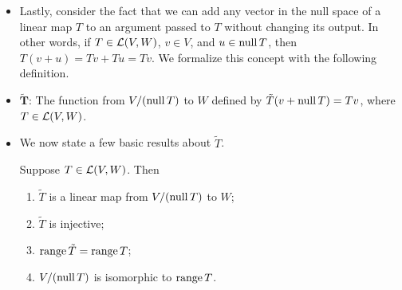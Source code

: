 \documentclass[../main.tex]{subfiles}
\begin{document}
\begin{itemize}
\begin{theorem}
        \begin{proof}
            Let $\pi$ be the quotient map from $V$ to $V/U$. From Theorem \ref{trm:affineEquivalenceProperties}, we know that in order for $w+U=0+U$, we must have $v-0=v\in U$. Thus, $\pi(u)=0$ if and only if $u\in U$, meaning $\nul\pi=U$. Additionally, we clearly have that $\range\pi=V/U$. Therefore, by the \hyperref[trm:fundamentalTheoremLinearMaps]{Fundamental Theorem of Linear Maps}, we have that
            \begin{align*}
                \dim V &= \dim\nul\pi+\dim\range\pi\\
                &= \dim U+\dim V/U\\
                \dim V/U &= \dim V-\dim U
            \end{align*}
            as desired.
        \end{proof}
    \end{theorem}
    \item Lastly, consider the fact that we can add any vector in the null space of a linear map $T$ to an argument passed to $T$ without changing its output. In other words, if $T\in\mathcal{L}(V,W)$, $v\in V$, and $u\in\operatorname{null} T$, then $T(v+u)=Tv+Tu=Tv$. We formalize this concept with the following definition.
    \item $\bm{\tilde{T}}$: The function from $V/(\operatorname{null} T)$ to $W$ defined by $\tilde{T}(v+\operatorname{null} T)=Tv$, where $T\in\mathcal{L}(V,W)$.
    \item We now state a few basic results about $\tilde{T}$.
    \begin{theorem}
        Suppose $T\in\mathcal{L}(V,W)$. Then
        \begin{enumerate}[label={\textup{(}\alph*\textup{)}}]
            \item $\tilde{T}$ is a linear map from $V/(\operatorname{null} T)$ to $W$;
            \item $\tilde{T}$ is injective;
            \item $\operatorname{range}\tilde{T}=\operatorname{range} T$;
            \item $V/(\operatorname{null} T)$ is isomorphic to $\operatorname{range} T$.
        \end{enumerate}
    \end{theorem}
\end{itemize}
\end{document}
